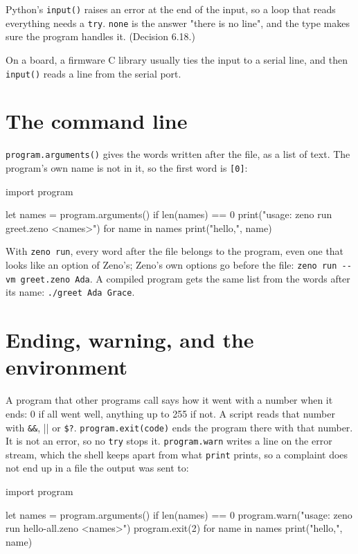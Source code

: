 \begin{why}
Python's \verb|input()| raises an error at the end of the input, so a
loop that reads everything needs a \verb|try|. \verb|none| is the
answer "there is no line", and the type makes sure the program
handles it. (Decision 6.18.)
\end{why}

On a board, a firmware C library usually ties the input to a serial
line, and then \verb|input()| reads a line from the serial port.

\section{The command line}

\verb|program.arguments()| gives the words written after the file, as
a list of text. The program's own name is not in it, so the first
word is \verb|[0]|:

\begin{zeno}[file=greet.zeno, args=Ada Grace]
import program

let names = program.arguments()
if len(names) == 0 {
    print("usage: zeno run greet.zeno <names>")
}
for name in names {
    print("hello,", name)
}
\end{zeno}

With \verb|zeno run|, every word after the file belongs to the
program, even one that looks like an option of Zeno's; Zeno's own
options go before the file: \verb|zeno run --vm greet.zeno Ada|. A
compiled program gets the same list from the words after its name:
\verb|./greet Ada Grace|.

\section{Ending, warning, and the environment}

A program that other programs call says how it went with a number
when it ends: 0 if all went well, anything up to 255 if not. A script
reads that number with \verb|&&|, \verb|||| or \verb|$?|.
\verb|program.exit(code)| ends the program there with that number.
It is not an error, so no \verb|try| stops it. \verb|program.warn|
writes a line on the error stream, which the shell keeps apart from
what \verb|print| prints, so a complaint does not end up in a file
the output was sent to:

\begin{zeno}[file=hello-all.zeno, fails=yes]
import program

let names = program.arguments()
if len(names) == 0 {
    program.warn("usage: zeno run hello-all.zeno <names>")
    program.exit(2)
}
for name in names {
    print("hello,", name)
}
\end{zeno}

